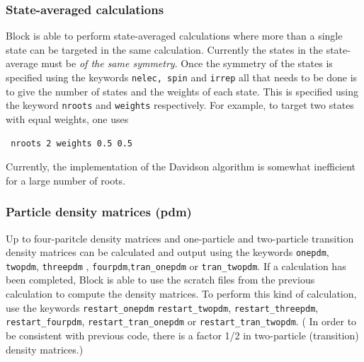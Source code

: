 \documentclass[letterpaper,12pt,aps, pra]{revtex4-1}
\begin{document}
\subsubsection{State-averaged calculations}
Block is able to perform state-averaged calculations where more than a single
state can be targeted in the same calculation. Currently the states in the
state-average must be \emph{of the same symmetry}. Once the symmetry of the
states is specified using the keywords \texttt{nelec, spin} and \texttt{irrep}
all that needs to be done is to give the number of states and the weights of
each state. This is specified using the keyword \texttt{nroots} and
\texttt{weights} respectively. For example, to target two states with equal
weights, one uses \begin{verbatim} nroots 2 weights 0.5 0.5 \end{verbatim}
Currently, the implementation of the Davidson algorithm is somewhat inefficient
for a large number of roots.

\subsubsection{Particle density matrices (pdm)}
Up to four-paritcle density matrices and one-particle and two-particle transition density matrices can be calculated and output
using the keywords \texttt{onepdm}, \texttt{twopdm}, \texttt{threepdm} , \texttt{fourpdm},\texttt{tran\_onepdm} or \texttt{tran\_twopdm}.  If a calculation has
been completed, Block is able to use the scratch files from the previous
calculation to compute the density matrices. To perform this kind of
calculation,  use the keywords \texttt{restart\_onepdm}
\texttt{restart\_twopdm}, \texttt{restart\_threepdm}, \texttt{restart\_fourpdm}, \texttt{restart\_tran\_onepdm} or \texttt{restart\_tran\_twopdm}.
( In order to be consistent with previous code, there is a factor 1/2 in two-particle (transition) density matrices.)
\end{document}
